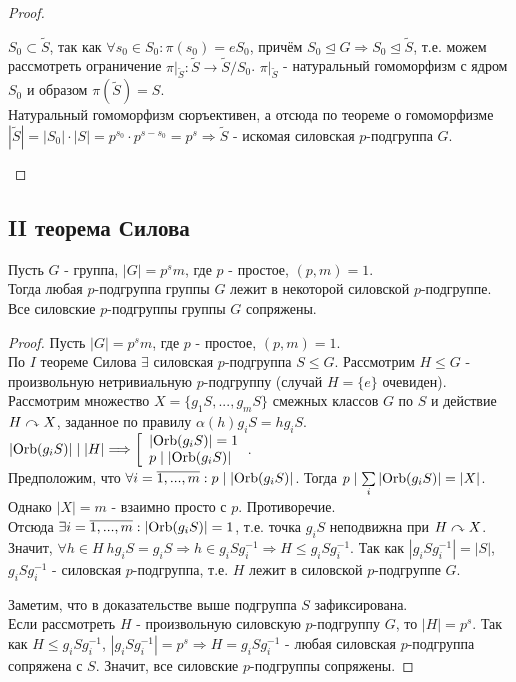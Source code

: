 \begin{proof}
\begin{enumerate}
\begin{enumerate}
            $S_0 \subset \tilde{S}$, так как $\forall s_0 \in S_0: \pi(s_0) = eS_0$, причём $S_0 \unlhd G \Longrightarrow S_0 \unlhd \tilde{S}$, т.е. можем рассмотреть ограничение $\pi|_{\tilde{S}}: \tilde{S} \rightarrow \tilde{S}/S_0$. $\pi|_{\tilde{S}}$ - натуральный гомоморфизм с ядром $S_0$ и образом $\pi(\tilde{S}) = S$.\\
            Натуральный гомоморфизм сюръективен, а отсюда по теореме о гомоморфизме $|\tilde{S}| = |S_0|\cdot|S| = p^{s_0} \cdot p^{s-s_0} = p^s \Longrightarrow \tilde{S}$ - искомая силовская $p$-подгруппа $G$. 
        \end{enumerate}
    \end{enumerate}
\end{proof}
\subsection{II теорема Силова}
Пусть $G$ - группа, $|G| = p^sm$, где $p$ - простое, $(p, m) = 1$.\\
Тогда любая $p$-подгруппа группы $G$ лежит в некоторой силовской $p$-подгруппе.\\
Все силовские $p$-подгруппы группы $G$ сопряжены.
\begin{proof}
    Пусть $|G| = p^sm$, где $p$ - простое, $(p, m) = 1$.\\
    По $I$ теореме Силова $\exists$ силовская $p$-подгруппа $S \leq G$.
    Рассмотрим $H \leq G$ - произвольную нетривиальную $p$-подгруппу (случай $H= \{e\}$ очевиден).\\
    Рассмотрим множество $X = \{g_1S,...,g_mS\}$ смежных классов $G$ по $S$ и действие $H \curvearrowright X$, заданное по правилу $\alpha(h)g_iS = hg_iS$.\\
    $|\textup{Orb}(g_iS)| \mid |H| \Longrightarrow \left[\begin{array}{l}
        |\textup{Orb}(g_iS)| = 1\\
        p \mid |\textup{Orb}(g_iS)|
    \end{array}\right.$.\\
    Предположим, что $\forall i = \overline{1,...,m}: p \mid |\textup{Orb}(g_iS)|$. Тогда $p \mid \sum \limits_i |\textup{Orb}(g_iS)| = |X|$. Однако $|X| = m$ - взаимно просто с $p$. Противоречие.\\
    Отсюда $\exists i = \overline{1,...,m}: |\textup{Orb}(g_iS)| = 1$, т.е. точка $g_iS$ неподвижна при $H \curvearrowright X$. Значит, $\forall h \in H\  hg_iS = g_iS \Longrightarrow h \in g_iSg_i^{-1} \Longrightarrow H \leq g_iSg_i^{-1}$. Так как $|g_iSg_i^{-1}| = |S|$, $g_iSg_i^{-1}$ - силовская $p$-подгруппа, т.е. $H$ лежит в силовской $p$-подгруппе $G$.

    Заметим, что в доказательстве выше подгруппа $S$ зафиксирована.\\
    Если рассмотреть $H$ - произвольную силовскую $p$-подгруппу $G$, то $|H| = p^s$. Так как $H \leq g_iSg_i^{-1}$, $|g_iSg_i^{-1}| = p^s \Longrightarrow H = g_iSg_i^{-1}$ - любая силовская $p$-подгруппа сопряжена с $S$. Значит, все силовские $p$-подгруппы сопряжены.
\end{proof}
